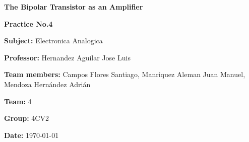 \begin{titlepage}
    {\Huge \textbf{The Bipolar Transistor as an Amplifier} \par}
    \vspace{0.5cm}
    
    {\Large\textbf{Practice No.4}\par}
    \vspace*{1.5cm}


    \vspace{2cm}

    \begin{flushleft}
        {\large \textbf{Subject:} Electronica Analogica\par}
        \vspace{0.5cm}
        {\large \textbf{Professor:} Hernandez Aguilar Jose Luis \par}
        \vspace{0.5cm}
        {\large \textbf{Team members:} Campos Flores Santiago, Manriquez Aleman Juan Manuel, 
        Mendoza Hernández Adrián \par}
        \vspace{0.5cm}
        {\large \textbf{Team:} 4 \par}
        \vspace{0.5cm}
        {\large \textbf{Group:} 4CV2 \par}
        \vspace{0.5cm}
        {\large \textbf{Date:} \today \par}
    \end{flushleft}

    \vfill
\end{titlepage}
